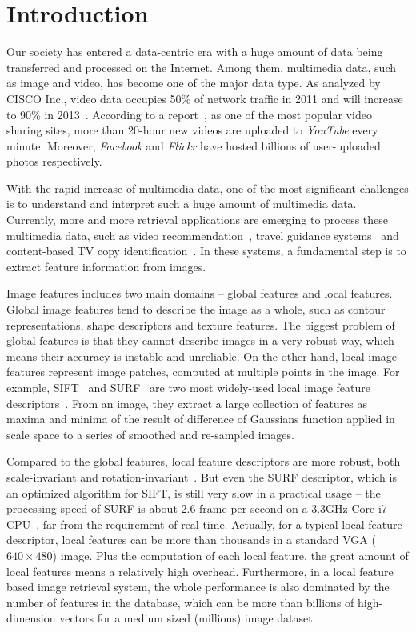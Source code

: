 \section{Introduction}
\label{sec:introduction}

Our society has entered a data-centric era with a huge amount of data being transferred and processed on the Internet. Among them, multimedia data, such as image and video, has become one of the major data type. As analyzed by CISCO Inc., video data occupies 50\% of network traffic in 2011 and will increase to 90\% in 2013~\cite{index2010forecast}.  According to a report~\cite{jansohn2009detecting}, as one of the most popular video sharing sites, more than 20-hour new videos are uploaded to \emph{YouTube} every minute. Moreover, \emph{Facebook} and \emph{Flickr} have hosted billions of user-uploaded photos respectively.

With the rapid increase of multimedia data, one of the most significant challenges is to understand and interpret such a huge amount of multimedia data. Currently, more and more retrieval applications are emerging to process these multimedia data, such as video recommendation~\cite{videorecommendation2007}, travel guidance systems~\cite{travelguidance2010} and content-based TV copy identification~\cite{tvidentify2003}. In these systems, a fundamental step is to extract feature information from images. 

Image features includes two main domains -- global features and local features. Global image features tend to describe the image as a whole, such as contour representations, shape descriptors and texture features. The biggest problem of global features is that they cannot describe images in a very robust way, which means their accuracy is instable and unreliable. On the other hand, local image features represent image patches, computed at multiple points in the image. For example, SIFT~\cite{Lowe2004SIFT,RobHess} and SURF~\cite{Bay2006SURF,Evans20009OpenSURF} are two most widely-used local image feature descriptors~\cite{Mikolajczyk2005Evaluation}\cite{Bauer2007Evaluation}. From an image, they extract a large collection of features as maxima and minima of the result of difference of Gaussians function applied in scale space to a series of smoothed and re-sampled images.

Compared to the global features, local feature descriptors are more robust, both scale-invariant and rotation-invariant~\cite{mikolajczyk2005performance}\cite{Bauer2007Evaluation}. But even the SURF descriptor, which is an optimized algorithm for SIFT, is still very slow in a practical usage -- the processing speed of SURF is about 2.6 frame per second on a 3.3GHz Core i7 CPU~\cite{Fang2011ispass}, far from the requirement of real time. Actually, for a typical local feature descriptor, local features can be more than thousands in a standard VGA ($640\times480$) image. Plus the computation of each local feature, the great amount of local features means a relatively high overhead. Furthermore, in a local feature based image retrieval system, the whole performance is also dominated by the number of features in the database, which can be more than billions of high-dimension vectors for a medium sized (millions) image dataset.

